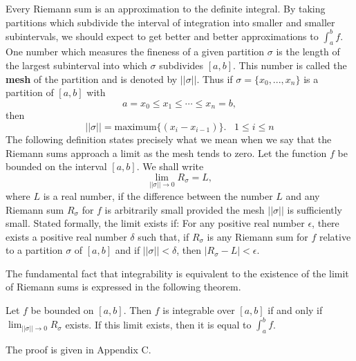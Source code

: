 
Every Riemann sum is an approximation to the definite integral. By taking partitions which subdivide the interval of integration into smaller and smaller subintervals, we should expect to get better and better approximations to $\int_a^b f$. One number which measures the fineness of a given partition $\sigma$ is the length of the largest subinterval into which $\sigma$ subdivides $[a, b]$. This number is called the \textbf{mesh} of the partition and is denoted by $||\sigma ||$. Thus if $\sigma = \{ x_0, ..., x_n \}$ is a partition of $[a, b]$ with
$$
a = x_0 \leq x_1 \leq \cdots \leq x_n = b,
$$
\noindent then 
$$
||\sigma || = \mbox{maximum} \{ (x_i - x_{i-1}) \} . \;\;\; 1 \leq  i \leq n
$$
\noindent The following definition states precisely what we mean when we say that the Riemann sums approach a limit as the mesh tends to zero. Let the function $f$ be bounded on the interval $[a, b]$. We shall write 
$$
\lim_{||\sigma || \rightarrow 0} R_\sigma = L,
$$
\noindent where $L$ is a real number, if the difference between the number $L$ and any Riemann sum $R_\sigma$ for $f$ is arbitrarily small provided the mesh $||\sigma||$ is sufficiently small. Stated formally, the limit exists if: For any positive real number $\epsilon$, there exists a positive real number $\delta$ such that, if $R_\sigma$ is any Riemann sum for $f$ relative to a partition $\sigma$ of $[a, b]$ and if $|| \sigma || < \delta$, then $ | R_\sigma - L | < \epsilon$.

The fundamental fact that integrability is equivalent to the existence of the limit of Riemann sums is expressed in the following theorem.

\begin{theorem} %
Let $f$ be bounded on $[a, b]$. Then $f$ is integrable over $[a, b]$ if and only if $\lim_{|| \sigma || \rightarrow 0} R_\sigma$ exists. If this limit exists, then it is equal to $\int_a^b f$.
\end{theorem}

The proof is given in Appendix C.

